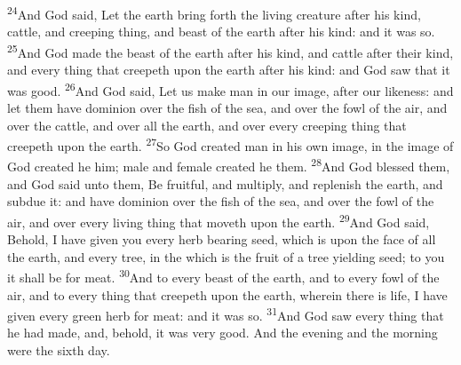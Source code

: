 \documentclass[10pt,oneside,a4paper]{memoir}
\renewcommand{\verse}[1]{\textsuperscript{#1}}
\begin{document}
\begin{paracol}{2}
\verse{24}And God said, Let the earth bring forth the living creature after his kind, cattle, and creeping thing, and beast of the earth after his kind: and it was so.  
\verse{25}And God made the beast of the earth after his kind, and cattle after their kind, and every thing that creepeth upon the earth after his kind: and God saw that it was good.  
\verse{26}And God said, Let us make man in our image, after our likeness: and let them have dominion over the fish of the sea, and over the fowl of the air, and over the cattle, and over all the earth, and over every creeping thing that creepeth upon the earth.  
\verse{27}So God created man in his own image, in the image of God created he him; male and female created he them.  
\verse{28}And God blessed them, and God said unto them, Be fruitful, and multiply, and replenish the earth, and subdue it: and have dominion over the fish of the sea, and over the fowl of the air, and over every living thing that moveth upon the earth.  
\verse{29}And God said, Behold, I have given you every herb bearing seed, which is upon the face of all the earth, and every tree, in the which is the fruit of a tree yielding seed; to you it shall be for meat.  
\verse{30}And to every beast of the earth, and to every fowl of the air, and to every thing that creepeth upon the earth, wherein there is life, I have given every green herb for meat: and it was so.  
\verse{31}And God saw every thing that he had made, and, behold, it was very good. And the evening and the morning were the sixth day.  
\end{paracol}
\end{document}
